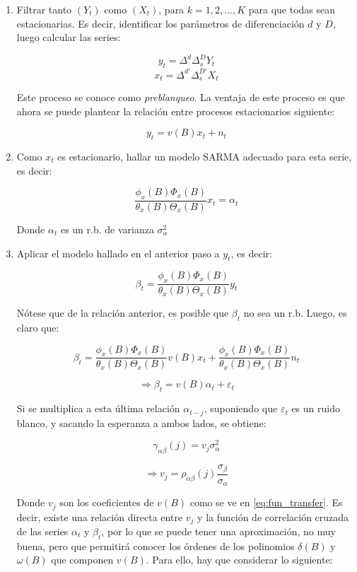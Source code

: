 \documentclass[12pt,oneside]{book}\usepackage[]{graphicx}\usepackage[]{color}
\theoremstyle{definition} %
\begin{document}
\begin{enumerate}
\item Filtrar tanto $(Y_t)$ como $(X_t)$, para $k=1,2,...,K$ para que todas sean estacionarias. Es decir, identificar los parámetros de diferenciación $d$ y $D$, luego calcular las series: 


$$y_t=\Delta^d \Delta_s^D Y_t $$
$$x_t=\Delta^{d'} \Delta_s^{D'} X_t $$

Este proceso se conoce como \textit{preblanqueo}. La ventaja de este proceso es que ahora se puede plantear la relación entre procesos estacionarios siguiente:


\begin{equation}\label{eq:transf_y}
y_t = v(B)x_t + n_t
\end{equation}


\item Como $x_t$ es estacionario, hallar un modelo SARMA adecuado para esta serie, es decir:

$$\frac{ \phi_x(B) \Phi_x(B) }{\theta_x(B) \Theta_x(B)} x_t= \alpha_t $$

Donde $\alpha_t$ es un r.b. de varianza $\sigma_{\alpha}^2$


\item Aplicar el modelo hallado en el anterior paso a $y_t$, es decir:

$$\beta_t = \frac{ \phi_x(B) \Phi_x(B)}{\theta_x(B) \Theta_x(B)} y_t$$

Nótese que de la relación anterior, es posible que $\beta_t$ no sea un r.b. Luego, es claro que:

$$\beta_t = \frac{ \phi_x(B) \Phi_x(B)}{\theta_x(B) \Theta_x(B)} v(B) x_t + \frac{ \phi_x(B) \Phi_x(B)}{\theta_x(B) \Theta_x(B)} n_t $$

\begin{equation}\label{eq:transf_bet}
\Longrightarrow  \beta_t = v(B) \alpha_t + \varepsilon_t
\end{equation}

Si se multiplica a esta última relación $\alpha_{t-j}$, suponiendo que $\varepsilon_t$ es un ruido blanco, y sacando la esperanza a ambos lados, se obtiene:

$$\gamma_{\alpha\beta}(j) = v_j \sigma_\alpha^2$$

$$\Longrightarrow  v_j = \rho_{\alpha\beta}(j)\frac{\sigma_\beta}{\sigma_\alpha}$$

Donde $v_j$ son los coeficientes de $v(B)$ como se ve en \ref{eq:fun_transfer}. Es decir, existe una relación directa entre $v_j$ y la función de correlación cruzada de las series $\alpha_t$ y $\beta_t$, por lo que se puede tener una aproximación, no muy buena, pero que permitirá conocer los órdenes de los polinomios $\delta(B)$ y $\omega(B)$ que componen $v(B)$. Para ello, hay que considerar lo siguiente: 


\end{enumerate}
\end{document}
